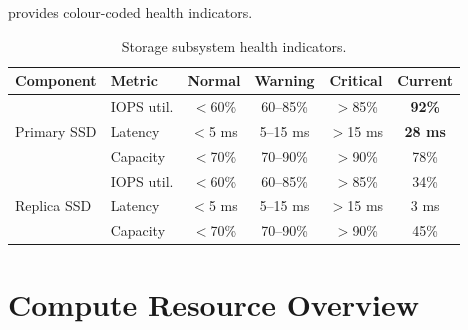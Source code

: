 \documentclass[
    language=english,
    doctype=technical-report,
    institution=none,
    titlestyle=book,
    oneside,
    loadGlossaries,
]{../../omnilatex}
\begin{document}
 provides colour-coded health indicators.

\begin{table}[htbp]
    \centering
    \caption{Storage subsystem health indicators.\footnotemark}
    \label{tab:storage-status}
    \begin{tabular}{@{}llcccc@{}}
        \toprule
        \textbf{Component} & \textbf{Metric}
            & \textbf{Normal} & \textbf{Warning} & \textbf{Critical}
            & \textbf{Current} \\
        \midrule
        \multirow{3}{*}{Primary SSD}
            & IOPS util.
            & \cellcolor{green!20}$<$60\%
            & \cellcolor{yellow!30}60--85\%
            & \cellcolor{red!20}$>$85\%
            & \cellcolor{red!30}\textbf{92\%} \\
            & Latency
            & \cellcolor{green!20}$<$5 ms
            & \cellcolor{yellow!30}5--15 ms
            & \cellcolor{red!20}$>$15 ms
            & \cellcolor{red!30}\textbf{28 ms} \\
            & Capacity
            & \cellcolor{green!20}$<$70\%
            & \cellcolor{yellow!30}70--90\%
            & \cellcolor{red!20}$>$90\%
            & \cellcolor{yellow!30}78\% \\
        \midrule
        \multirow{3}{*}{Replica SSD}
            & IOPS util.
            & \cellcolor{green!20}$<$60\%
            & \cellcolor{yellow!30}60--85\%
            & \cellcolor{red!20}$>$85\%
            & \cellcolor{green!20}34\% \\
            & Latency
            & \cellcolor{green!20}$<$5 ms
            & \cellcolor{yellow!30}5--15 ms
            & \cellcolor{red!20}$>$15 ms
            & \cellcolor{green!20}3 ms \\
            & Capacity
            & \cellcolor{green!20}$<$70\%
            & \cellcolor{yellow!30}70--90\%
            & \cellcolor{red!20}$>$90\%
            & \cellcolor{green!20}45\% \\
        \bottomrule
    \end{tabular}
\end{table}
\addtocounter{footnote}{-1}

\section{Compute Resource Overview}
\end{document}
